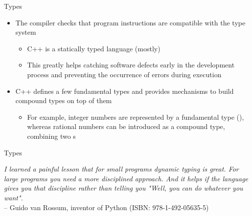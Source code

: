 \begin{frame}{Types \insertcontinuationtext}

  \begin{itemize}[<+->]
  \item The compiler checks that program instructions are compatible with the type system
    \begin{itemize}
    \item C++ is a \alert{statically typed} language (mostly)
    \item This greatly helps catching software defects early in the development
      process and preventing the occurrence of errors during execution
    \end{itemize}
  \item C++ defines a few fundamental types and provides mechanisms to build
    compound types on top of them
    \begin{itemize}
    \item For example, integer numbers are represented by a fundamental type
      (), whereas rational numbers can be introduced as a compound
      type, combining two s
    \end{itemize}
  \end{itemize}

\end{frame}

\begin{frame}{Types \insertcontinuationtext}

  \textit{I learned a painful lesson that for small programs dynamic typing is
  great. For large programs you need a more disciplined approach. And it helps
  if the language gives you that discipline rather than telling you "Well, you
  can do whatever you want".}\\
  \vspace{2mm}
  \footnotesize{-- Guido van Rossum, inventor of Python (ISBN: 978-1-492-05635-5)}

\end{frame}

